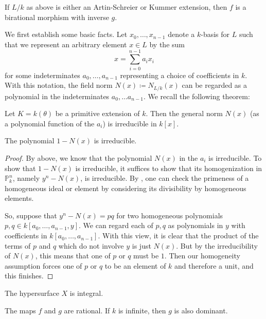 \documentclass[letterpaper, openany, 10pt]{article}
\begin{document}
\begin{proposition}
	If $L/k$ as above is either an Artin-Schreier or Kummer extension, then $f$ is a birational morphism with inverse $g$.
\end{proposition}

We first establish some basic facts. Let $x_0, \ldots, x_{n-1}$ denote a $k$-basis for $L$ such that we represent an arbitrary element $x \in L$ by the sum
\[
	x = \sum_{i=0}^{n-1} a_i x_i
\]
for some indeterminates $a_0, \ldots, a_{n-1}$ representing a choice of coefficients in $k$. With this notation, the field norm $N(x) \coloneqq N_{L/k}(x)$ can be regarded as a polynomial in the indeterminates $a_0, \ldots a_{n-1}$. We recall the following theorem:

\begin{theorem}
	Let $K = k(\theta)$ be a primitive extension of $k$. Then the general norm $N(x)$ (as a polynomial function of the $a_i$) is irreducible in $k[x]$.
\end{theorem}

\begin{lemma}
	The polynomial $1 - N(x)$ is irreducible.
\end{lemma}

\begin{proof}
	By \cite[Theorem 1]{flanders} above, we know that the polynomial $N(x)$ in the $a_i$ is irreducible. To show that $1 - N(x)$ is irreducible, it suffices to show that its homogenization in $\mathbb{P}_k^n$, namely $y^n - N(x)$, is irreducible. By \cite[Exercise 4.5.F(c)]{vakil}, one can check the primeness of a homogeneous ideal or element by considering its divisibility by homogeneous elements.

	So, suppose that $y^n - N(x) = pq$ for two homogeneous polynomials $p,q \in k[a_0, \ldots, a_{n-1}, y]$. We can regard each of $p,q$ as polynomials in $y$ with coefficients in $k[a_0, \ldots, a_{n-1}]$. With this view, it is clear that the product of the terms of $p$ and $q$ which do not involve $y$ is just $N(x)$. But by the irreducibility of $N(x)$, this means that one of $p$ or $q$ must be $1$. Then our homogeneity assumption forces one of $p$ or $q$ to be an element of $k$ and therefore a unit, and this finishes.
\end{proof}

\begin{corollary}
	The hypersurface $X$ is integral.
\end{corollary}

\begin{lemma}
	The maps $f$ and $g$ are rational. If $k$ is infinite, then $g$ is also dominant.
\end{lemma}
\end{document}
